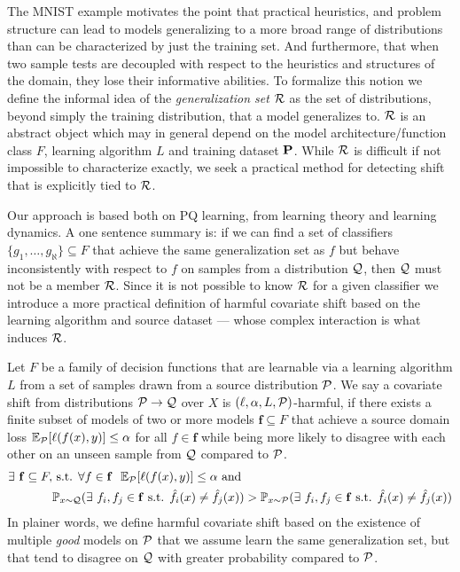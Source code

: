 The MNIST example motivates the point that practical heuristics, and problem structure can lead to models generalizing to a more broad range of distributions than can be characterized by just the training set.
And furthermore, that when two sample tests are decoupled with respect to the heuristics and structures of the domain, they lose their informative abilities.
To formalize this notion we define the informal idea of the \textit{generalization set} $\mathcal{R}$ as the set of distributions, beyond simply the training distribution, that a model generalizes to.
$\mathcal{R}$ is an abstract object which may in general depend on the model architecture/function class $F$, learning algorithm $L$ and training dataset $\mathbf{P}$.
While $\mathcal{R}$ is difficult if not impossible to characterize exactly, we seek a practical method for detecting shift that is explicitly tied to $\mathcal{R}$.

Our approach is based both on PQ learning, from learning theory and learning dynamics.
A one sentence summary is: if we can find a set of classifiers $\{g_1,\ldots, g_\aleph\}\subseteq F$ that achieve the same generalization
set as $f$ but behave inconsistently with respect to $f$ on samples from a distribution $\mathcal{Q}$, then $\mathcal{Q}$ must not be a member $\mathcal{R}$.
Since it is not possible to know $\mathcal{R}$ for a given classifier we introduce a more practical definition of harmful covariate shift
based on the learning algorithm and source dataset --- whose complex interaction is what induces $\mathcal{R}$.

\begin{definition}
    Let $F$ be a family of decision functions that are learnable via a learning algorithm ${L}$ from a set of samples drawn from a source distribution $\mathcal{P}$.
    We say a covariate shift from distributions $\mathcal{P} \to \mathcal{Q}$ over $X$ is $(\ell, \alpha, L, \mathcal{P})$-harmful,
    if there exists a finite subset of models of two or more models $\mathbf{f} \subseteq F$ that achieve a source domain loss $\mathbb{E}_{\mathcal{P}}[\ell(f(x), y)] \leq \alpha$ for all $f\in \mathbf{f}$ while
    being more likely to disagree with each other on an unseen sample from $\mathcal{Q}$ compared to $\mathcal{P}$.
    \begin{equation}
        \begin{aligned}
            \exists\ \mathbf{f}\subseteq F, &\text{ s.t. } \forall f\in \mathbf{f}\ \ \mathbb{E}_{\mathcal{P}}[\ell(f(x), y)] \leq \alpha \text{ and } \\
            &\mathbb{P}_{x\sim \mathcal{Q}}(\exists\ f_i, f_j \in \mathbf{f}\text{ s.t. }\hat{f}_i(x)\neq \hat{f}_j(x)) > \mathbb{P}_{x\sim \mathcal{P}}(\exists\ f_i, f_j \in \mathbf{f}\text{ s.t. }\hat{f}_i(x)\neq \hat{f}_j(x))
        \end{aligned}\label{eq:hcs}
    \end{equation}
    In plainer words, we define harmful covariate shift based on the existence of multiple \textit{good} models on $\mathcal{P}$ that we assume learn the same generalization set, but
    that tend to disagree on $\mathcal{Q}$ with greater probability compared to $\mathcal{P}$.
\end{definition}


